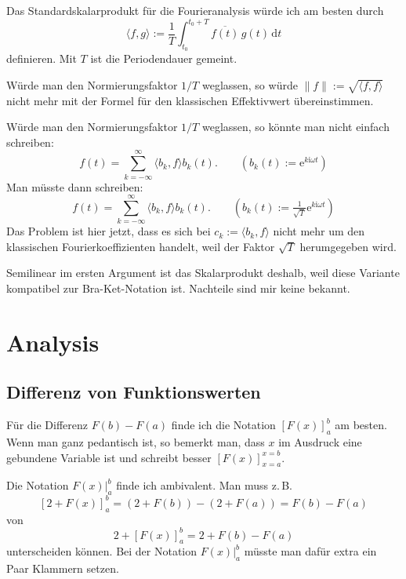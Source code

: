 \documentclass[a4paper,11pt,fleqn]{article}
\newcommand{\ee}{\mathrm e}
\newcommand{\ui}{\mathrm i}
\begin{document}
Das Standardskalarprodukt für die Fourieranalysis würde ich
am besten durch
\begin{equation}\label{eq:FourierSP}
\langle f,g\rangle := \frac{1}{T}\int_{t_0}^{t_0+T}
\overline{f(t)}\,g(t)\,\mathrm dt
\end{equation}
definieren. Mit $T$ ist die Periodendauer gemeint.

Würde man den Normierungsfaktor $1/T$ weglassen, so würde
$\|f\|:=\sqrt{\langle f,f\rangle}$ nicht mehr mit der Formel
für den klassischen Effektivwert übereinstimmen.

Würde man den Normierungsfaktor $1/T$ weglassen, so könnte man
nicht einfach schreiben:
\begin{equation}
f(t) = \sum_{k=-\infty}^\infty \langle b_k,f\rangle b_k(t).
\qquad (b_k(t):=\ee^{k\ui \omega t})
\end{equation}
Man müsste dann schreiben:
\begin{equation}
f(t) = \sum_{k=-\infty}^{\infty} \langle b_k,f\rangle b_k(t).
\qquad(b_k(t):=\tfrac{1}{\sqrt{T}}\ee^{k\ui \omega t})
\end{equation}
Das Problem ist hier jetzt, dass es sich bei $c_k:=\langle b_k,f\rangle$
nicht mehr um den klassischen Fourierkoeffizienten handelt, weil
der Faktor $\sqrt{T}$ herumgegeben wird.

Semilinear im ersten Argument ist das Skalarprodukt deshalb, weil
diese Variante kompatibel zur Bra-Ket-Notation ist. Nachteile sind
mir keine bekannt.

\section{Analysis}
\subsection{Differenz von Funktionswerten}
Für die Differenz $F(b)-F(a)$ finde ich die Notation $[F(x)]_a^b$
am besten. Wenn man ganz pedantisch ist, so bemerkt man, dass
$x$ im Ausdruck eine gebundene Variable ist und schreibt besser
$[F(x)]_{x=a}^{x=b}$.

Die Notation $F(x)|_a^b$ finde ich ambivalent. Man muss z.\,B.
\[[2+F(x)]_a^b = (2+F(b))-(2+F(a)) = F(b)-F(a)\]
von
\[2+[F(x)]_a^b = 2+F(b)-F(a)\]
unterscheiden können. Bei der Notation $F(x)|_a^b$ müsste
man dafür extra ein Paar Klammern setzen.
\end{document}
